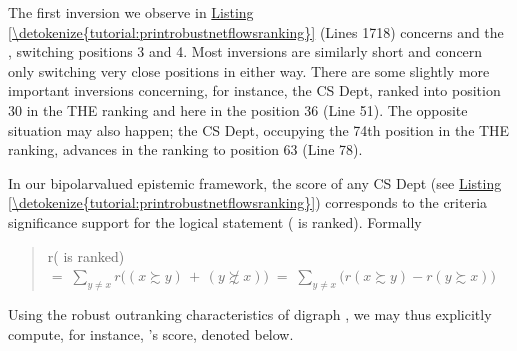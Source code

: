 \documentclass[a4paper,12pt,english]{sphinxhowto}
\begin{document}
The first inversion we observe in \hyperref[\detokenize{tutorial:printrobustnetflowsranking}]{Listing \ref{\detokenize{tutorial:printrobustnetflowsranking}}} (Lines 17\sphinxhyphen{}18) concerns  and the , switching positions 3 and 4. Most inversions are similarly short and concern only switching very close positions in either way. There are some slightly more important inversions concerning, for instance, the  CS Dept, ranked into position 30 in the THE ranking and here in the position 36 (Line 51). The opposite situation may also happen; the  CS Dept, occupying the 74th position in the THE ranking, advances in the  ranking to position 63 (Line 78).

In our bipolar\sphinxhyphen{}valued epistemic framework, the  score of any CS Dept  (see \hyperref[\detokenize{tutorial:printrobustnetflowsranking}]{Listing \ref{\detokenize{tutorial:printrobustnetflowsranking}}}) corresponds to the criteria significance support for the logical statement ( is \sphinxhyphen{}ranked). Formally
\begin{quote}

r( is \sphinxhyphen{}ranked) \(= \; \sum_{y \neq x} r\big((x \succsim y) \,+\, (y \not\succsim x)\big) \;=\; \sum_{y \neq x} \big(r(x \succsim y) - r(y \succsim x)\big)\)
\end{quote}

Using the robust outranking characteristics of digraph , we may thus explicitly compute, for instance, ’s score, denoted  below.

\begin{sphinxVerbatim}[commandchars=\\\{\},numbers=left,firstnumber=1,stepnumber=1]
  
  
   
       
          \PYG{p}{[}\PYG{p}{]}\PYG{p}{[}\PYG{p}{]}  \PYG{p}{[}\PYG{p}{]}\PYG{p}{[}\PYG{p}{]}
 
\end{sphinxVerbatim}
\end{document}
